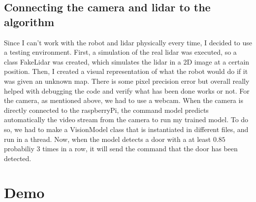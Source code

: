 \documentclass{article}
\begin{document}
\subsection{Connecting the camera and lidar to the algorithm}

Since I can't work with the robot and lidar physically every time, I decided to use a testing environment. First, a simulation of the real lidar was executed, so a class FakeLidar was created, which simulates the lidar in a 2D image at a certain position. Then, I created a visual representation of what the robot would do if it was given an unknown map. There is some pixel precision error but overall really helped with debugging the code and verify what has been done works or not. For the camera, as mentioned above, we had to use a webcam. When the camera is directly connected to the raspberryPi, the command model predicts automatically the video stream from the camera to run my trained model. To do so, we had to make a VisionModel class that is instantiated in different files, and run in a thread. Now, when the model detects a door with a at least $0.85$ probabiliy $3$ times in a row, it will send the command that the door has been detected. 

\newpage 
\section{Demo}
\end{document}
